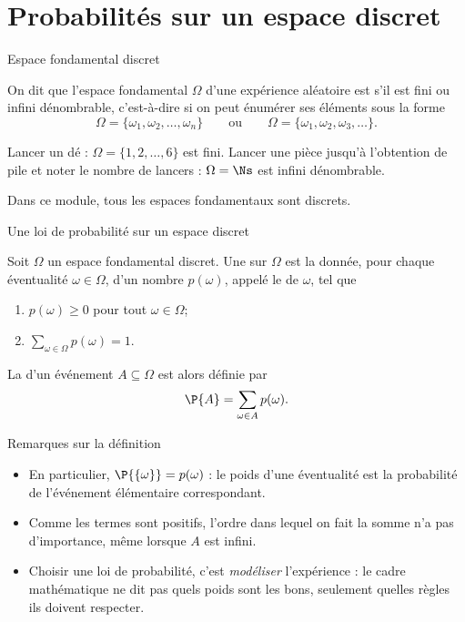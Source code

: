 \documentclass[nuit,charter,pied,handout]{BeamerJS}
\begin{document}

\section{Probabilités sur un espace discret}

\begin{frame}[t]{Espace fondamental discret}
\pause
	\begin{defn}
		On dit que l'espace fondamental \(\Omega\) d'une expérience aléatoire est  s'il est fini ou infini dénombrable, c'est-à-dire si on peut énumérer ses éléments sous la forme
		\[\Omega=\{\omega_1,\omega_2,\ldots,\omega_n\}\qquad\text{ou}\qquad\Omega=\{\omega_1,\omega_2,\omega_3,\ldots\}.\]
	\end{defn}
	\pause
	\begin{exs}
		Lancer un dé : \(\Omega=\{1,2,\ldots,6\}\) est fini. \pause Lancer une pièce jusqu'à l'obtention de pile et noter le nombre de lancers : \(\Omega=\Ns\) est infini dénombrable.
	\end{exs}
	\pause
	\begin{lumiere}
		Dans ce module, tous les espaces fondamentaux sont discrets.
	\end{lumiere}
\end{frame}

\begin{frame}[t]{Une loi de probabilité sur un espace discret}
\pause
	\begin{defn}
		Soit \(\Omega\) un espace fondamental discret. Une  sur \(\Omega\) est la donnée, pour chaque éventualité \(\omega\in\Omega\), d'un nombre \(p(\omega)\), appelé le  de \(\omega\), tel que\pause
		\begin{enumerate}
			\item \(p(\omega)\geq 0\) pour tout \(\omega\in\Omega\);\pause
			\item \(\displaystyle\sum_{\omega\in\Omega}p(\omega)=1\).
		\end{enumerate}
		\pause
		La  d'un événement \(A\subseteq\Omega\) est alors définie par
		\[\P{A}=\sum_{\omega\in A}p(\omega).\]
	\end{defn}
\end{frame}

\begin{frame}{Remarques sur la définition}
\pause
	\begin{rems}
		\begin{itemize}
			\item En particulier, \(\P{\{\omega\}}=p(\omega)\) : le poids d'une éventualité est la probabilité de l'événement élémentaire correspondant.\pause
			\item Comme les termes sont positifs, l'ordre dans lequel on fait la somme n'a pas d'importance, même lorsque \(A\) est infini.\pause
			\item Choisir une loi de probabilité, c'est \emph{modéliser} l'expérience : le cadre mathématique ne dit pas quels poids sont les bons, seulement quelles règles ils doivent respecter.
		\end{itemize}
	\end{rems}
\end{frame}
\end{document}
